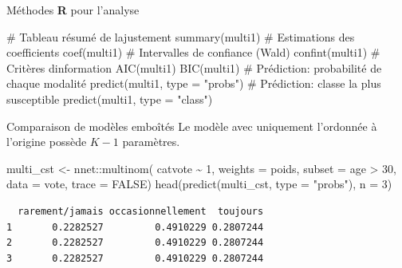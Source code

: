 \documentclass[
  ignorenonframetext,
]{beamer}
\newenvironment{Shaded}{\begin{snugshade}}{\end{snugshade}}
\newcommand{\AttributeTok}[1]{\textcolor[rgb]{0.40,0.45,0.13}{#1}}
\newcommand{\CommentTok}[1]{\textcolor[rgb]{0.37,0.37,0.37}{#1}}
\newcommand{\ConstantTok}[1]{\textcolor[rgb]{0.56,0.35,0.01}{#1}}
\newcommand{\DecValTok}[1]{\textcolor[rgb]{0.68,0.00,0.00}{#1}}
\newcommand{\FunctionTok}[1]{\textcolor[rgb]{0.28,0.35,0.67}{#1}}
\newcommand{\NormalTok}[1]{\textcolor[rgb]{0.00,0.23,0.31}{#1}}
\newcommand{\OtherTok}[1]{\textcolor[rgb]{0.00,0.23,0.31}{#1}}
\newcommand{\SpecialCharTok}[1]{\textcolor[rgb]{0.37,0.37,0.37}{#1}}
\newcommand{\StringTok}[1]{\textcolor[rgb]{0.13,0.47,0.30}{#1}}
\begin{document}
\begin{frame}[fragile]{Méthodes \textbf{R} pour l'analyse}
\label{muxe9thodes-r-pour-lanalyse}
\begin{Shaded}
\begin{Highlighting}[numbers=left,,]
\CommentTok{\# Tableau résumé de l\textquotesingle{}ajustement}
\FunctionTok{summary}\NormalTok{(multi1)}
\CommentTok{\# Estimations des coefficients}
\FunctionTok{coef}\NormalTok{(multi1)}
\CommentTok{\# Intervalles de confiance (Wald)}
\FunctionTok{confint}\NormalTok{(multi1)}
\CommentTok{\# Critères d\textquotesingle{}information}
\FunctionTok{AIC}\NormalTok{(multi1)}
\FunctionTok{BIC}\NormalTok{(multi1)}
\CommentTok{\# Prédiction: probabilité de chaque modalité}
\FunctionTok{predict}\NormalTok{(multi1, }\AttributeTok{type =} \StringTok{"probs"}\NormalTok{)}
\CommentTok{\# Prédiction: classe la plus susceptible}
\FunctionTok{predict}\NormalTok{(multi1, }\AttributeTok{type =} \StringTok{"class"}\NormalTok{)}
\end{Highlighting}
\end{Shaded}
\end{frame}

\begin{frame}[fragile]{Comparaison de modèles emboîtés}
\label{comparaison-de-moduxe8les-embouxeetuxe9s}
Le modèle avec uniquement l'ordonnée à l'origine possède \(K-1\)
paramètres.

\begin{Shaded}
\begin{Highlighting}[numbers=left,,]
\NormalTok{multi\_cst }\OtherTok{\textless{}{-}}\NormalTok{ nnet}\SpecialCharTok{::}\FunctionTok{multinom}\NormalTok{(}
\NormalTok{  catvote }\SpecialCharTok{\textasciitilde{}} \DecValTok{1}\NormalTok{,}
  \AttributeTok{weights =}\NormalTok{ poids,}
  \AttributeTok{subset =}\NormalTok{ age }\SpecialCharTok{\textgreater{}} \DecValTok{30}\NormalTok{,}
  \AttributeTok{data =}\NormalTok{ vote,}
  \AttributeTok{trace =} \ConstantTok{FALSE}\NormalTok{)}
\FunctionTok{head}\NormalTok{(}\FunctionTok{predict}\NormalTok{(multi\_cst, }\AttributeTok{type =} \StringTok{"probs"}\NormalTok{), }\AttributeTok{n =} \DecValTok{3}\NormalTok{)}
\end{Highlighting}
\end{Shaded}

\begin{verbatim}
  rarement/jamais occasionnellement  toujours
1       0.2282527         0.4910229 0.2807244
2       0.2282527         0.4910229 0.2807244
3       0.2282527         0.4910229 0.2807244
\end{verbatim}
\end{frame}
\end{document}
